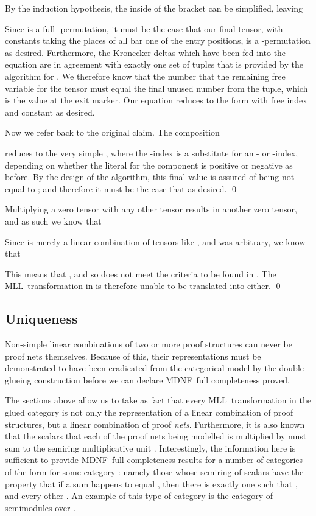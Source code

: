 \documentclass{LMCS}
\theoremstyle{plain}\newtheorem*{cLm}{Claim}
\newcommand{\mll}{MLL} \newcommand{\mall}{MALL}
\newcommand{\p}{} \newcommand{\N}{\mathbb{N}}
\begin{document}
\begin{clmenv}
\begin{itemize}
    
    
    By the induction hypothesis, the inside of the bracket can be simplified, leaving
    
    
    Since  is a full -permutation, it must be the case that our final tensor, with constants taking the places of all bar one of the entry positions, is a -permutation as desired. Furthermore, the Kronecker deltas which have been fed into the equation are in agreement with exactly one set of tuples that is provided by the algorithm for . We therefore know that the number that the remaining free variable for the tensor must equal the final unused number from the tuple, which is the value at the exit marker. Our equation reduces to the form  with free index  and constant  as desired.
    
    
\end{itemize}
    Now we refer back to the original claim. The composition
      
           
    reduces to the very simple , where the -index is a substitute for an - or -index, depending on whether the literal for the component  is positive or negative as before. By the design of the algorithm, this final value  is assured of being not equal to ; and therefore it must be the case that  as desired. \qed
    \end{clmenv}
      
    \noindent Multiplying a zero tensor with any other tensor results in another
    zero tensor, and as such we know that
    
    Since
     is merely a linear combination of
    tensors like , and  was arbitrary, we know that
    
    This means that
    , and so
     does not meet the criteria to be found in .
    The \mll\ transformation  in  is therefore unable to be
    translated into  either. \qed
  
  \subsection{Uniqueness} \label{SubsectionUniqueness}
  
  Non-simple linear combinations of two or more proof structures can never be proof nets themselves. Because of this, their representations must be demonstrated to have been eradicated from the categorical model by the double glueing construction before we can declare MDNF~full completeness proved.
  
  \p The sections above allow us to take as fact that every \mll~transformation in the glued category  is not only the representation of a linear combination of proof structures, but a linear combination of proof \emph{nets}. Furthermore, it is also known that the scalars that each of the proof nets being modelled is multiplied by must sum to the semiring multiplicative unit . Interestingly, the information here is sufficient to provide MDNF~full completeness results for a number of categories of the form  for some category : namely those whose semiring of scalars have the property that if a sum  happens to equal , then there is exactly one  such that , and every other . An example of this type of category is the category of semimodules over .
  
\end{document}
